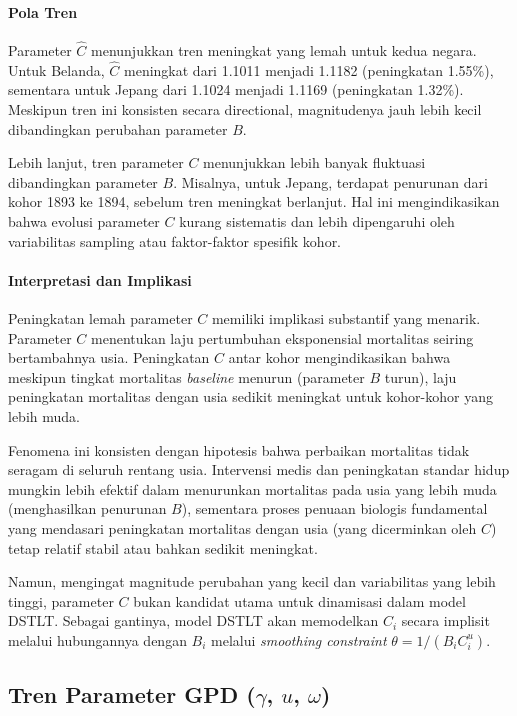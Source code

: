 \paragraph{Pola Tren}
Parameter $\hat{C}$ menunjukkan tren meningkat yang lemah untuk kedua negara. Untuk Belanda, $\hat{C}$ meningkat dari 1.1011 menjadi 1.1182 (peningkatan 1.55\%), sementara untuk Jepang dari 1.1024 menjadi 1.1169 (peningkatan 1.32\%). Meskipun tren ini konsisten secara directional, magnitudenya jauh lebih kecil dibandingkan perubahan parameter $B$.

Lebih lanjut, tren parameter $C$ menunjukkan lebih banyak fluktuasi dibandingkan parameter $B$. Misalnya, untuk Jepang, terdapat penurunan dari kohor 1893 ke 1894, sebelum tren meningkat berlanjut. Hal ini mengindikasikan bahwa evolusi parameter $C$ kurang sistematis dan lebih dipengaruhi oleh variabilitas sampling atau faktor-faktor spesifik kohor.

\paragraph{Interpretasi dan Implikasi}
Peningkatan lemah parameter $C$ memiliki implikasi substantif yang menarik. Parameter $C$ menentukan laju pertumbuhan eksponensial mortalitas seiring bertambahnya usia. Peningkatan $C$ antar kohor mengindikasikan bahwa meskipun tingkat mortalitas \textit{baseline} menurun (parameter $B$ turun), laju peningkatan mortalitas dengan usia sedikit meningkat untuk kohor-kohor yang lebih muda.

Fenomena ini konsisten dengan hipotesis bahwa perbaikan mortalitas tidak seragam di seluruh rentang usia. Intervensi medis dan peningkatan standar hidup mungkin lebih efektif dalam menurunkan mortalitas pada usia yang lebih muda (menghasilkan penurunan $B$), sementara proses penuaan biologis fundamental yang mendasari peningkatan mortalitas dengan usia (yang dicerminkan oleh $C$) tetap relatif stabil atau bahkan sedikit meningkat.

Namun, mengingat magnitude perubahan yang kecil dan variabilitas yang lebih tinggi, parameter $C$ bukan kandidat utama untuk dinamisasi dalam model DSTLT. Sebagai gantinya, model DSTLT akan memodelkan $C_i$ secara implisit melalui hubungannya dengan $B_i$ melalui \textit{smoothing constraint} $\theta = 1/(B_i C_i^u)$.

\subsection{Tren Parameter GPD ($\gamma$, $u$, $\omega$)}


